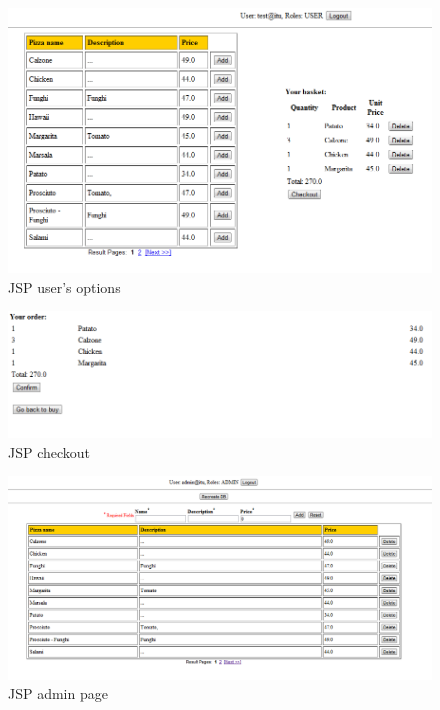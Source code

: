 \begin{figure}[H]
    \begin{center}
        \includegraphics[width=\textwidth]{fig/jsp_buy.png}
        \caption{JSP user's options}
        \label{fig.jsp_index}
    \end{center}
\end{figure}

\begin{figure}[H]
    \begin{center}
        \includegraphics[width=\textwidth]{fig/jsp_checkout.png}
        \caption{JSP checkout}
        \label{fig.jsp_index}
    \end{center}
\end{figure}

\begin{figure}[H]
    \begin{center}
        \includegraphics[width=\textwidth]{fig/jsp_admin.png}
        \caption{JSP admin page}
        \label{fig.jsp_index}
    \end{center}
\end{figure}

